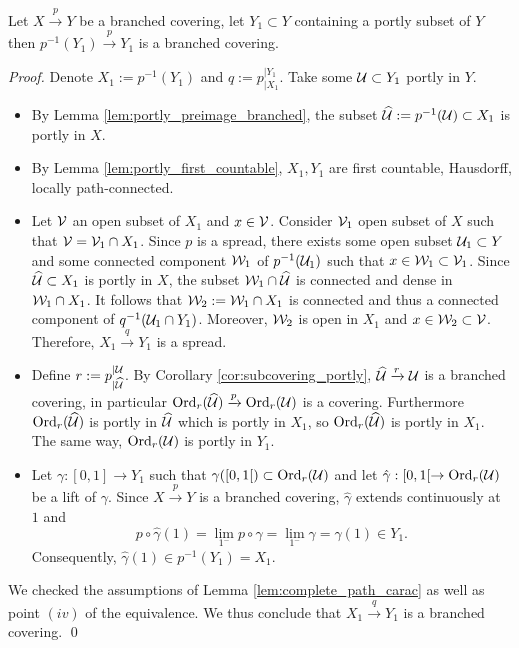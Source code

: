\begin{lem}\label{lem:subcovering_general}
 Let $X\xrightarrow{p} Y$ be a branched covering, let $Y_1\subset Y$ containing a portly subset of $Y$ then $p^{-1}(Y_1)\xrightarrow{~p~}Y_1$ is a branched covering.
\end{lem}
\begin{proof} Denote $X_1:=p^{-1}(Y_1)$ and $q:= p_{|X_1}^{|Y_1}$. Take some $\mathcal{U}\subset Y_1$ portly in $Y$.
\begin{itemize}

 \item By Lemma \ref{lem:portly_preimage_branched}, the subset $\widehat {\mathcal{U}} :=p^{-1}(\mathcal{U})\subset X_1$ is portly in $X$.  
  \item By Lemma \ref{lem:portly_first_countable},  $X_1,Y_1$ are first countable, Hausdorff, locally path-connected.
 \item Let $\mathcal V$ an open subset of $X_1$ and $x\in \mathcal V$. Consider $\mathcal V_1$ open subset of $X$ such that $\mathcal V=\mathcal V_1\cap X_1$. Since $p$ is a spread, there exists some open subset $\mathcal{U}_1\subset Y$ and some connected component $\mathcal W_1$ of $p^{-1}(\mathcal{U}_1)$ such that $x\in \mathcal W_1 \subset \mathcal V_1$. Since $\widehat {\mathcal{U}}\subset X_1$ is portly in $X$, the subset  $\mathcal W_1\cap \widehat {\mathcal{U}}$ is connected and dense in $\mathcal W_1\cap X_1$. It follows that $\mathcal W_2:=\mathcal W_1\cap X_1$ is connected and thus a connected component of $q^{-1}(\mathcal{U}_1\cap Y_1)$.
 Moreover, $\mathcal W_2$ is open in $X_1$ and  $x\in \mathcal W_2\subset \mathcal V$. 
 Therefore, $X_1 \xrightarrow{q} Y_1$ is a spread. 
 \item Define $r:=p_{|\widehat {\mathcal{U}}}^{|\mathcal{U}}$. By Corollary \ref{cor:subcovering_portly}, $\widehat {\mathcal{U}}\xrightarrow{r}\mathcal{U}$ is a branched covering, in particular $\mathrm{Ord}_{r}(\widehat {\mathcal{U}})\xrightarrow{p} \mathrm{Ord}_r(\mathcal{U})$ is a covering. 
 Furthermore $\mathrm{Ord}_r(\widehat {\mathcal{U}})$ is portly in $\widehat {\mathcal{U}}$ which is portly in $X_1$, so $\mathrm{Ord}_r(\widehat {\mathcal{U}})$ is portly in $X_1$. The same way, $\mathrm{Ord}_r(\mathcal{U})$ is portly in $Y_1$.
 \item Let $\gamma : [0,1] \rightarrow Y_1$ such that $\gamma([0,1[) \subset \mathrm{Ord}_r(\mathcal{U})$ and let $\hat \gamma : [0,1[\rightarrow \mathrm{Ord}_r(\mathcal{U})$ be a lift of $\gamma$. Since $X\xrightarrow{p} Y$ is a branched covering, $\hat\gamma$ extends continuously at $1$ and $$p\circ \hat \gamma(1)=\lim_{1^-}p\circ \hat\gamma =\lim_{1^-}\gamma =\gamma(1)\in Y_1.$$
 Consequently, $\hat\gamma(1)\in p^{-1}(Y_1)=X_1$.
\end{itemize}

We checked the assumptions of Lemma \ref{lem:complete_path_carac} as well as point $(iv)$ of the equivalence. We thus conclude that $X_1\xrightarrow{q} Y_1$ is a branched covering.
\qed\end{proof}



